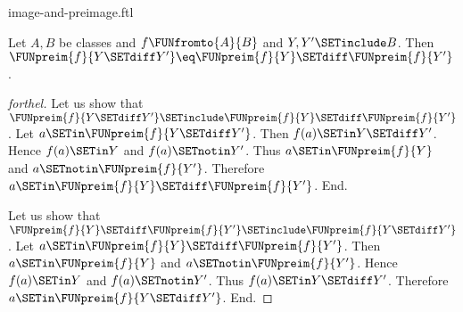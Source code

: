 \documentclass{naproche-library}
\begin{document}
\begin{smodule}[title=Computation Laws for Images and Preimages]{image-and-preimage.ftl}
\begin{proposition}[forthel,id=FOUNDATIONS_07_6552168641331200]
  Let $A, B$ be classes and $f \FUNfromto{A}{B}$ and $Y, Y' \SETinclude B$.
  Then $\FUNpreim{f}{Y \SETdiff Y'} \eq \FUNpreim{f}{Y} \SETdiff \FUNpreim{f}{Y'}$.
\end{proposition}
\begin{proof}[forthel]
  Let us show that $\FUNpreim{f}{Y \SETdiff Y'} \SETinclude \FUNpreim{f}{Y} \SETdiff \FUNpreim{f}{Y'}$.
    Let $a \SETin \FUNpreim{f}{Y \SETdiff Y'}$.
    Then $f(a) \SETin Y \SETdiff Y'$.
    Hence $f(a) \SETin Y$ and $f(a) \SETnotin Y'$.
    Thus $a \SETin \FUNpreim{f}{Y}$ and $a \SETnotin \FUNpreim{f}{Y'}$.
    Therefore $a \SETin \FUNpreim{f}{Y} \SETdiff \FUNpreim{f}{Y'}$.
  End.

  Let us show that $\FUNpreim{f}{Y} \SETdiff \FUNpreim{f}{Y'} \SETinclude \FUNpreim{f}{Y \SETdiff Y'}$.
    Let $a \SETin \FUNpreim{f}{Y} \SETdiff \FUNpreim{f}{Y'}$.
    Then $a \SETin \FUNpreim{f}{Y}$ and $a \SETnotin \FUNpreim{f}{Y'}$.
    Hence $f(a) \SETin Y$ and $f(a) \SETnotin Y'$.
    Thus $f(a) \SETin Y \SETdiff Y'$.
    Therefore $a \SETin \FUNpreim{f}{Y \SETdiff Y'}$.
  End.
\end{proof}
\end{smodule}
\end{document}
